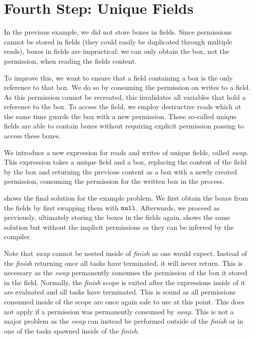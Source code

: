 \section{Fourth Step: Unique Fields}
In the previous example, we did not store boxes in fields.
Since permissions cannot be stored in fields (they could easily be duplicated through multiple reads), boxes in fields are impractical: we can only obtain the box, not the permission, when reading the fields content.

To improve this, we want to ensure that a field containing a box is the only reference to that box. We do so by consuming the permission on writes to a field. As this permission cannot be recreated, this invalidates all variables that hold a reference to the box. To access the field, we employ destructive reads which at the same time guards the box with a new permission. These so-called unique fields are able to contain boxes without requiring explicit permission passing to access these boxes.

We introduce a new expression for reads and writes of unique fields, called \textit{swap}. This expression takes a unique field and a box, replacing the content of the field by the box and returning the previous content as a box with a newly created permission, consuming the permission for the written box in the process.

 shows the final solution for the example problem. We first obtain the boxes from the fields by first swapping them with $\texttt{null}$. Afterwards, we proceed as previously, ultimately storing the boxes in the fields again.  shows the same solution but without the implicit permissions as they can be inferred by the compiler.

Note that \textit{swap} cannot be nested inside of \textit{finish} as one would expect. Instead of the \textit{finish} returning once all tasks have terminated, it will never return. This is necessary as the \textit{swap} permanently consumes the permission of the box it stored in the field. Normally, the \textit{finish} scope is exited after the expressions inside of it are evaluated and all tasks have terminated. This is sound as all permissions consumed inside of the scope are once again safe to use at this point. This does not apply if a permission was permanently consumed by \textit{swap}. This is not a major problem as the \textit{swap} can instead be performed outside of the \textit{finish} or in one of the tasks spawned inside of the \textit{finish}.

